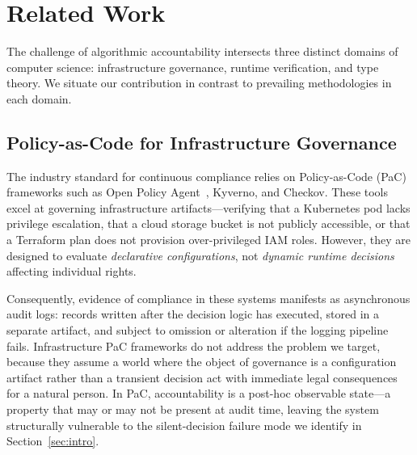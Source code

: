 
\section{Related Work}
\label{sec:related_work}

The challenge of algorithmic accountability intersects three distinct
domains of computer science: infrastructure governance, runtime
verification, and type theory.
We situate our contribution in contrast to prevailing methodologies
in each domain.

\subsection{Policy-as-Code for Infrastructure Governance}
\label{sec:pac}

The industry standard for continuous compliance relies on
Policy-as-Code (PaC) frameworks such as Open Policy
Agent~\cite{opa2024}, Kyverno, and Checkov.
These tools excel at governing infrastructure artifacts---verifying
that a Kubernetes pod lacks privilege escalation, that a cloud
storage bucket is not publicly accessible, or that a Terraform plan
does not provision over-privileged IAM roles.
However, they are designed to evaluate \emph{declarative
configurations}, not \emph{dynamic runtime decisions} affecting
individual rights.

Consequently, evidence of compliance in these systems manifests as
asynchronous audit logs: records written after the decision logic has
executed, stored in a separate artifact, and subject to omission or
alteration if the logging pipeline fails.
Infrastructure PaC frameworks do not address the problem we target,
because they assume a world where the object of governance is a
configuration artifact rather than a transient decision act with
immediate legal consequences for a natural person.
In PaC, accountability is a post-hoc observable state---a property
that may or may not be present at audit time, leaving the system
structurally vulnerable to the silent-decision failure mode we
identify in Section~\ref{sec:intro}.

